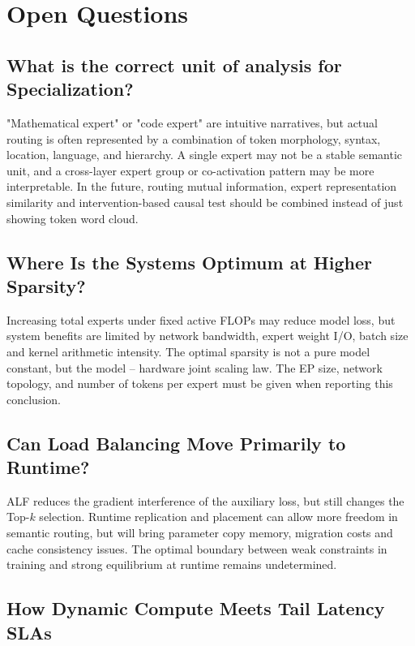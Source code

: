\documentclass[10pt,a4paper,fontset=none]{ctexart}
\begin{document}
\section{Open Questions}

\subsection{What is the correct unit of analysis for Specialization?}

"Mathematical expert" or "code expert" are intuitive narratives, but actual routing is often represented by a combination of token morphology, syntax, location, language, and hierarchy. A single expert may not be a stable semantic unit, and a cross-layer expert group or co-activation pattern may be more interpretable. In the future, routing mutual information, expert representation similarity and intervention-based causal test should be combined instead of just showing token word cloud.

\subsection{Where Is the Systems Optimum at Higher Sparsity?}

Increasing total experts under fixed active FLOPs may reduce model loss, but system benefits are limited by network bandwidth, expert weight I/O, batch size and kernel arithmetic intensity. The optimal sparsity is not a pure model constant, but the model -- hardware joint scaling law. The EP size, network topology, and number of tokens per expert must be given when reporting this conclusion.

\subsection{Can Load Balancing Move Primarily to Runtime?}

ALF reduces the gradient interference of the auxiliary loss, but still changes the Top-$k$ selection. Runtime replication and placement can allow more freedom in semantic routing, but will bring parameter copy memory, migration costs and cache consistency issues. The optimal boundary between weak constraints in training and strong equilibrium at runtime remains undetermined.

\subsection{How Dynamic Compute Meets Tail Latency SLAs}
\end{document}
